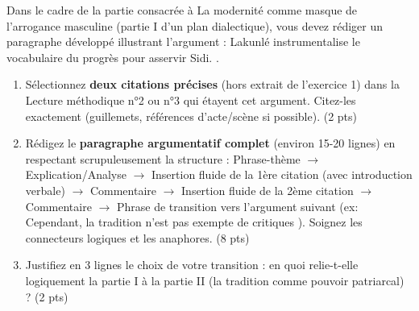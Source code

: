 \documentclass[11pt]{article}
\begin{document}
\begin{exercice}
Dans le cadre de la partie consacrée à \og La modernité comme masque de l'arrogance masculine \fg{} (partie I d'un plan dialectique), vous devez rédiger un paragraphe développé illustrant l'argument : \og Lakunlé instrumentalise le vocabulaire du progrès pour asservir Sidi. \fg{}.

\begin{enumerate}
    \item Sélectionnez \textbf{deux citations précises} (hors extrait de l'exercice 1) dans la Lecture méthodique n°2 ou n°3 qui étayent cet argument. Citez-les exactement (guillemets, références d'acte/scène si possible). (2 pts)
    \item Rédigez le \textbf{paragraphe argumentatif complet} (environ 15-20 lignes) en respectant scrupuleusement la structure : Phrase-thème $\rightarrow$ Explication/Analyse $\rightarrow$ Insertion fluide de la 1ère citation (avec introduction verbale) $\rightarrow$ Commentaire $\rightarrow$ Insertion fluide de la 2ème citation $\rightarrow$ Commentaire $\rightarrow$ Phrase de transition vers l'argument suivant (ex: \og Cependant, la tradition n'est pas exempte de critiques \fg{}). Soignez les connecteurs logiques et les anaphores. (8 pts)
    \item Justifiez en 3 lignes le choix de votre transition : en quoi relie-t-elle logiquement la partie I à la partie II (la tradition comme pouvoir patriarcal) ? (2 pts)
\end{enumerate}
\end{exercice}
\end{document}
